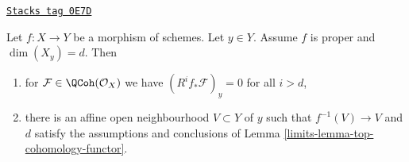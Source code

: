 \begin{lemma}
\label{limits-lemma-higher-direct-images-zero-above-dimension-fibre}
\href{https://stacks.math.columbia.edu/tag/0E7D}{\texttt{Stacks tag 0E7D}}

Let $f : X \to Y$ be a morphism of schemes. Let $y \in Y$.
Assume $f$ is proper and $\dim(X_y) = d$.
Then
\begin{enumerate}
\item for $\mathcal{F} \in \QCoh(\mathcal{O}_X)$
we have $(R^if_*\mathcal{F})_y = 0$ for all $i > d$,
\item there is an affine open neighbourhood $V \subset Y$
of $y$ such that $f^{-1}(V) \to V$ and $d$ satisfy the
assumptions and conclusions of Lemma \ref{limits-lemma-top-cohomology-functor}.
\end{enumerate}
\end{lemma}

